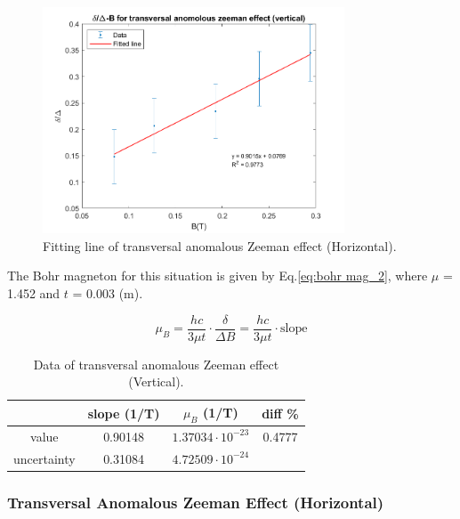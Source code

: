 \documentclass[a4paper,12pt]{article}
\begin{document}
    \begin{figure}[H]
        \centering
        \includegraphics[width=0.8\textwidth]{tra_ano_ver_data.png}
            \caption{Fitting line of transversal anomalous Zeeman effect (Horizontal).}
        \label{fig:tra_ano_ver_data}
    \end{figure}
    
    \par The Bohr magneton for this situation is given by Eq.\ref{eq:bohr mag_2}, where $\mu$ = 1.452 and $t$ = 0.003 (m).
    
    \begin{equation}
        \mu_B = \frac{hc}{3\mu t} \cdot \frac{\delta}{\Delta B}=\frac{hc}{3\mu t} \cdot \text{slope}
        \label{eq:bohr mag_2}  
    \end{equation}
    
    \begin{table}[H]
        \centering
        \caption{Data of transversal anomalous Zeeman effect (Vertical).}
        \begin{tabular}{c|c|c|c}
             &slope (1/T)& $\mu_B$ (1/T)& diff \% \\ \hline \hline
            value&0.90148&$1.37034\cdot 10^{-23}$&0.4777  \\ \hline
            uncertainty&0.31084&$4.72509\cdot 10^{-24}$& \\ \hline
            
        \end{tabular}
        \label{tab:tra_ano_ver_final_data}
    \end{table}
    
    \subsubsection{Transversal Anomalous Zeeman Effect (Horizontal)}\label{4.2.4}
    
\end{document}
